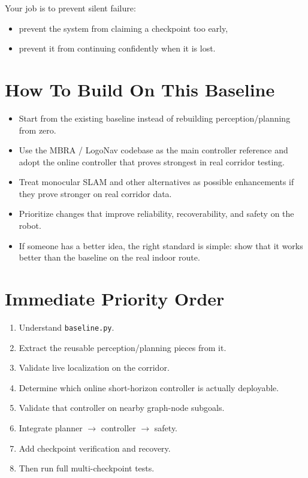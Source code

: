 \documentclass[11pt,a4paper]{article}
\begin{document}
Your job is to prevent silent failure:
\begin{itemize}[nosep]
  \item prevent the system from claiming a checkpoint too early,
  \item prevent it from continuing confidently when it is lost.
\end{itemize}


\section{How To Build On This Baseline}

\begin{itemize}[nosep]
  \item Start from the existing baseline instead of rebuilding perception/planning from zero.
  \item Use the MBRA / LogoNav codebase as the main controller reference and adopt the online controller that proves strongest in real corridor testing.
  \item Treat monocular SLAM and other alternatives as possible enhancements if they prove stronger on real corridor data.
  \item Prioritize changes that improve reliability, recoverability, and safety on the robot.
  \item If someone has a better idea, the right standard is simple: show that it works better than the baseline on the real indoor route.
\end{itemize}


\section{Immediate Priority Order}

\begin{enumerate}[nosep]
  \item Understand \texttt{baseline.py}.
  \item Extract the reusable perception/planning pieces from it.
  \item Validate live localization on the corridor.
  \item Determine which online short-horizon controller is actually deployable.
  \item Validate that controller on nearby graph-node subgoals.
  \item Integrate planner $\rightarrow$ controller $\rightarrow$ safety.
  \item Add checkpoint verification and recovery.
  \item Then run full multi-checkpoint tests.
\end{enumerate}
\end{document}
